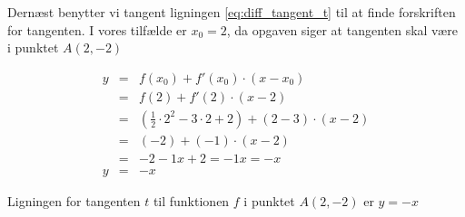 \documentclass[11pt,a5paper,fleqn,leqno]{book}
\begin{document}
Dernæst benytter vi tangent ligningen \eqref{eq:diff_tangent_t} til at finde forskriften for tangenten. I vores tilfælde er $x_0 = 2$, da opgaven siger at tangenten skal være i punktet $A(2,-2)$

\begin{displaymath}\begin{array}{rcl}
y & = & f(x_0)+f'(x_0) \cdot (x - x_0) \\
  & = & f(2)+f'(2) \cdot (x - 2) \\
  & = & (\frac{1}{2} \cdot 2^2 - 3 \cdot 2 + 2) + (2 - 3) \cdot (x - 2) \\
  & = & (-2) + (-1) \cdot (x - 2) \\
  & = & -2 - 1x + 2 = -1x = -x \\
y & = & -x
\end{array} \end{displaymath}

Ligningen for tangenten $t$ til funktionen $f$ i punktet $A(2,-2)$ er \underline{\underline{$y = -x$}}
\end{document}
